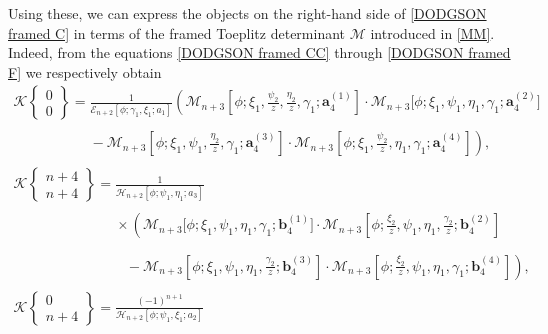 \documentclass[pdftex]{sigma}
\numberwithin{equation}{section}
\newcommand{\ga}{\gamma}
\begin{document}
		Using these, we can express the objects on the right-hand side of \eqref{DODGSON framed C} in terms of the framed Toeplitz determinant $\mathscr{M}$ introduced in \eqref{MM}. Indeed, from the equations \eqref{DODGSON framed CC} through \eqref{DODGSON framed F} we respectively obtain
		\begin{gather*}
				\mathscr{K}\left\lbrace \begin{matrix} 0 \\ 0 \end{matrix} \right\rbrace = \frac{1}{\mathscr{E}_{n+2}[\phi;\ga_1,\xi_1;a_1]} \left( \mathscr{M}_{n+3}\left[\phi; \xi_1, \frac{\psi_2}{z}, \frac{\eta_2}{z}, \ga_1; \boldsymbol{a}^{(1)}_4\right]\cdot \mathscr{M}_{n+3}\big[\phi; \xi_1, \psi_1, \eta_1, \ga_1; \boldsymbol{a}^{(2)}_4\big] \right. \\
\phantom{\mathscr{K}\left\lbrace \begin{matrix} 0 \\ 0 \end{matrix} \right\rbrace =}{} - \left. \mathscr{M}_{n+3}\left[\phi; \xi_1, \psi_1, \frac{\eta_2}{z}, \ga_1; \boldsymbol{a}^{(3)}_4\right]\cdot \mathscr{M}_{n+3}\left[\phi; \xi_1, \frac{\psi_2}{z}, \eta_1, \ga_1; \boldsymbol{a}^{(4)}_4\right] \right),
\\
				\mathscr{K}\left\lbrace \begin{matrix} n+4 \\ n+4 \end{matrix} \right\rbrace = \frac{1}{\mathscr{H}_{n+2}[\phi;\psi_1,\eta_1;a_3]}\\
\phantom{\mathscr{K}\left\lbrace \begin{matrix} n+4 \\ n+4 \end{matrix} \right\rbrace= }{} \times \left( \mathscr{M}_{n+3}\big[\phi; \xi_1, \psi_1, \eta_1, \ga_1; \boldsymbol{b}^{(1)}_4\big]\cdot \mathscr{M}_{n+3}\left[\phi; \frac{\xi_2}{z}, \psi_1, \eta_1, \frac{\ga_2}{z}; \boldsymbol{b}^{(2)}_4\right] \right. \\
\phantom{\mathscr{K}\left\lbrace \begin{matrix} n+4 \\ n+4 \end{matrix} \right\rbrace =\times}{} - \left. \mathscr{M}_{n+3}\left[\phi; \xi_1, \psi_1, \eta_1, \frac{\ga_2}{z}; \boldsymbol{b}^{(3)}_4\right]\cdot \mathscr{M}_{n+3}\left[\phi; \frac{\xi_2}{z}, \psi_1, \eta_1, \ga_1; \boldsymbol{b}^{(4)}_4\right] \right),
\\
				\mathscr{K}\left\lbrace \begin{matrix} 0 \\ n+4 \end{matrix} \right\rbrace = \frac{(-1)^{n+1}}{\mathscr{H}_{n+2}[\phi;\psi_1,\xi_1;a_2]} \\

\end{gather*}
\end{document}
